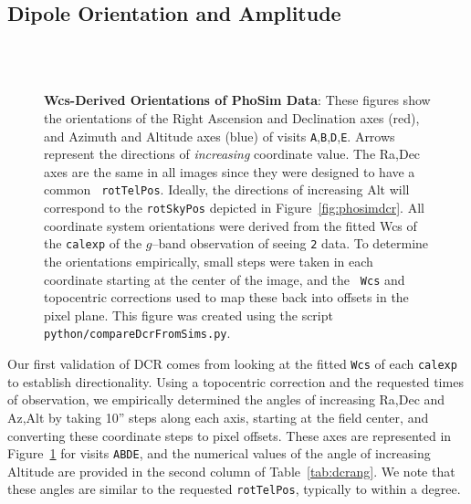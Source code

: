 \documentclass[prd, nofootinbib, floatfix, 11pt, tightenlines, times]{article}
\def\figdir{../figures}
\def\A{{\tt A}}
\def\B{{\tt B}}
\def\D{{\tt D}}
\def\E{{\tt E}}
\begin{document}
\subsection{Dipole Orientation and Amplitude}

\begin{figure}
    \centering
    \qquad
     \\
    \qquad
     \\
    \caption{{\bf Wcs-Derived Orientations of PhoSim Data}: These
      figures show the orientations of the Right Ascension and
      Declination axes (red), and Azimuth and Altitude axes (blue) of
      visits \A,\B,\D,\E.  Arrows represent the directions of {\it
        increasing} coordinate value.  The Ra,Dec axes are the same in
      all images since they were designed to have a common {\tt
        rotTelPos}.  Ideally, the directions of increasing Alt will
      correspond to the {\tt rotSkyPos} depicted in
      Figure~\ref{fig:phosimdcr}.  All coordinate system orientations
      were derived from the fitted Wcs of the {\tt calexp} of the
      $g$--band observation of seeing {\tt 2} data.  To determine the
      orientations empirically, small steps were taken in each
      coordinate starting at the center of the image, and the {\tt
        Wcs} and topocentric corrections used to map these back into
      offsets in the pixel plane.  This figure was created using the
      script {\tt python/compareDcrFromSims.py}.}
    \label{fig:wcsdcr}
\end{figure}

Our first validation of DCR comes from looking at the fitted {\tt Wcs}
of each {\tt calexp} to establish directionality.  Using a topocentric
correction and the requested times of observation, we empirically
determined the angles of increasing Ra,Dec and Az,Alt by taking 10''
steps along each axis, starting at the field center, and converting
these coordinate steps to pixel offsets.  These axes are represented
in Figure~\ref{fig:wcsdcr} for visits \A\B\D\E, and the numerical
values of the angle of increasing Altitude are provided in the second
column of Table~\ref{tab:dcrang}.  We note that these angles are
similar to the requested {\tt rotTelPos}, typically to within a
degree.
\end{document}
